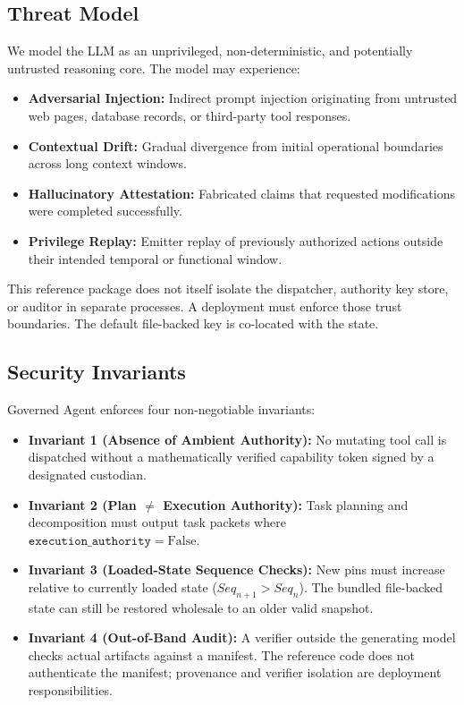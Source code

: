 \documentclass[11pt,a4paper]{article}
\begin{document}
\subsection{Threat Model}
We model the LLM as an unprivileged, non-deterministic, and potentially untrusted reasoning core. The model may experience:
\begin{itemize}
    \item \textbf{Adversarial Injection:} Indirect prompt injection originating from untrusted web pages, database records, or third-party tool responses.
    \item \textbf{Contextual Drift:} Gradual divergence from initial operational boundaries across long context windows.
    \item \textbf{Hallucinatory Attestation:} Fabricated claims that requested modifications were completed successfully.
    \item \textbf{Privilege Replay:} Emitter replay of previously authorized actions outside their intended temporal or functional window.
\end{itemize}

This reference package does not itself isolate the dispatcher, authority key store, or auditor in separate processes. A deployment must enforce those trust boundaries. The default file-backed key is co-located with the state.

\subsection{Security Invariants}
Governed Agent enforces four non-negotiable invariants:
\begin{itemize}
    \item \textbf{Invariant 1 (Absence of Ambient Authority):} No mutating tool call is dispatched without a mathematically verified capability token signed by a designated custodian.
    \item \textbf{Invariant 2 (Plan $\neq$ Execution Authority):} Task planning and decomposition must output task packets where $\mathtt{execution\_authority} = \text{False}$.
    \item \textbf{Invariant 3 (Loaded-State Sequence Checks):} New pins must increase relative to currently loaded state ($Seq_{n+1} > Seq_n$). The bundled file-backed state can still be restored wholesale to an older valid snapshot.
    \item \textbf{Invariant 4 (Out-of-Band Audit):} A verifier outside the generating model checks actual artifacts against a manifest. The reference code does not authenticate the manifest; provenance and verifier isolation are deployment responsibilities.
\end{itemize}
\end{document}

